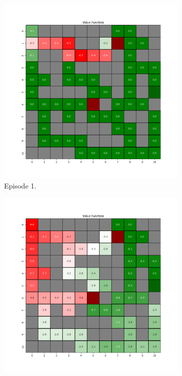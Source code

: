 \documentclass{assignment}
\begin{document}
\begin{figure}[H]
    \begin{subfigure}{0.3\textwidth}
        \includegraphics[width=\textwidth]{figures/value_q/epsilon_sweep/value_function_alpha_0.1_gamma_0.95_epsilon_0.5_iteration_1.png}
    \caption{Episode 1.}
    \end{subfigure}\hfill
    \begin{subfigure}{0.3\textwidth}
        \includegraphics[width=\textwidth]{figures/value_q/epsilon_sweep/value_function_alpha_0.1_gamma_0.95_epsilon_0.5_iteration_50.png}

\end{subfigure}
\end{figure}
\end{document}
